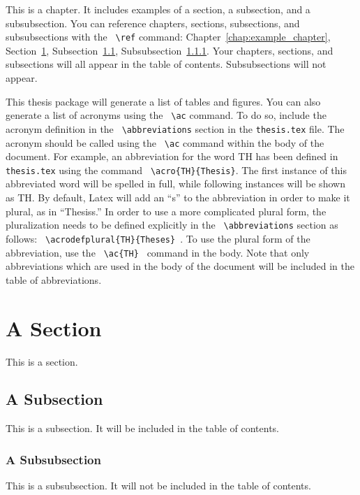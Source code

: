 
This is a chapter. It includes examples of a section, a subsection, and a subsubsection. You can reference chapters, sections, subsections, and subsubsections with the \texttt{ \textbackslash ref} command: Chapter~\ref{chap:example_chapter}, Section~\ref{sec:example_section}, Subsection~\ref{sec:example_subsection}, Subsubsection~\ref{sec:example_subsubsection}. Your chapters, sections, and subsections will all appear in the table of contents. Subsubsections will not appear. 

This thesis package will generate a list of tables and figures. You can also generate a list of acronyms using the \texttt{ \textbackslash ac} command. To do so, include the acronym definition in the \texttt{ \textbackslash abbreviations} section in the \texttt{thesis.tex} file. The acronym should be called using the \texttt{ \textbackslash ac} command within the body of the document. For example, an abbreviation for the word \ac{TH} has been defined in \texttt{thesis.tex} using the command \texttt{ \textbackslash acro\{TH\}\{Thesis\}}. The first instance of this abbreviated word will be spelled in full, while following instances will be shown as \ac{TH}. By default, Latex will add an ``s'' to the abbreviation in order to make it plural, as in ``Thesiss.'' In order to use a more complicated plural form, the pluralization needs to be defined explicitly in the \texttt{ \textbackslash abbreviations} section as follows: \texttt{ \textbackslash acrodefplural\{TH\}\{Theses\} }. To use the plural form of the abbreviation, use the \texttt{ \textbackslash ac\{TH\} } command in the body. Note that only abbreviations which are used in the body of the document will be included in the table of abbreviations. 


\section{A Section} \label{sec:example_section} 

This is a section. 

\subsection{A Subsection} \label{sec:example_subsection} 

This is a subsection. It will be included in the table of contents. 

\subsubsection{A Subsubsection} \label{sec:example_subsubsection} 

This is a subsubsection. It will not be included in the table of contents. 

